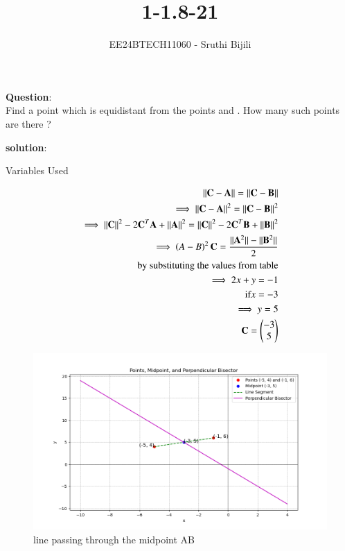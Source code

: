\documentclass[journal]{IEEEtran}
\begin{document}

\vspace{3cm}

\title{1-1.8-21}
\author{EE24BTECH11060 - Sruthi Bijili}
{\let\newpage\relax\maketitle}

\renewcommand{\thefigure}{\theenumi}
\renewcommand{\thetable}{\theenumi}
\setlength{\intextsep}{10pt} %


\renewcommand{\thetable}{\theenumi}

\textbf{Question}:\\
Find a point which is equidistant from the points  and . How many such points are there ?

\textbf{solution}:\\
\begin{table}[h!]    
  \centering
  
  \caption{Variables Used}
  \label{tab1.1.8.21}
\end{table}
\begin{align}
||\mathbf{C}-\mathbf{A}||=||\mathbf{C}-\mathbf{B}||\\
\implies||\mathbf{C}-\mathbf{A}||^2=||\mathbf{C}-\mathbf{B}||^2\\
\implies||\mathbf{C}||^2-2\mathbf{C}^T\mathbf{A}+||\mathbf{A}||^2=||\mathbf{C}||^2-2\mathbf{C}^T\mathbf{B}+||\mathbf{B}||^2\\
\implies\left(A-B\right)^2\mathbf{C}=\frac{||\mathbf{A}^2||-||\mathbf{B}^2||}{2}\\
\text{ by substituting the values from table}\\
\implies 2x+y=-1\\
\text{if} x=-3\\
\implies y=5\\
\mathbf{C}=\begin{pmatrix}-3 \\ 5\end{pmatrix}
\end{align}
\begin{figure}[h!]
   \centering
   \includegraphics[width=0.7\linewidth]{figs/fig1.png}
   \caption{line passing through the midpoint AB}
\end{figure}
\end{document}
